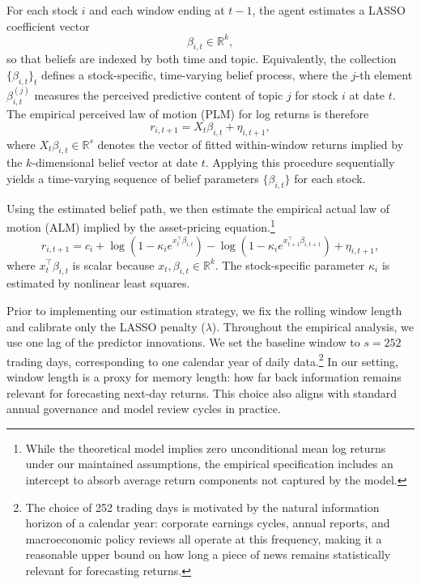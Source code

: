 For each stock \(i\) and each window ending at \(t-1\), the agent estimates a LASSO
coefficient vector
\begin{equation}
\beta_{i,t} \in \mathbb{R}^{k},
\end{equation}
so that beliefs are indexed by both time and topic. Equivalently, the collection
\(\{\beta_{i,t}\}_t\) defines a stock-specific, time-varying belief process, where the
\(j\)-th element \(\beta_{i,t}^{(j)}\) measures the perceived predictive content of topic \(j\)
for stock \(i\) at date \(t\).
The empirical perceived law of motion (PLM) for log returns is therefore
\begin{equation}\label{eq:empirical_plm}
r_{i,t+1} = X_t \beta_{i,t} + \eta_{i,t+1},
\end{equation}
where \(X_t \beta_{i,t} \in \mathbb{R}^{s}\) denotes the vector of fitted within-window returns
implied by the \(k\)-dimensional belief vector at date \(t\).
Applying this procedure sequentially yields a time-varying sequence of belief parameters
\(\{\beta_{i,t}\}\) for each stock.

Using the estimated belief path, we then estimate the empirical actual law of motion
(ALM) implied by the asset-pricing equation.\footnote{While the theoretical model implies
zero unconditional mean log returns under our maintained assumptions, the empirical
specification includes an intercept to absorb average return components not captured by
the model.}
\begin{equation}\label{eq:empirical_alm}
r_{i,t+1}
= c_i
+ \log\!\left(1 - \kappa_i e^{x_t^\top \beta_{i,t}}\right)
- \log\!\left(1 - \kappa_i e^{x_{t+1}^\top \beta_{i,t+1}}\right)
+ \eta_{i,t+1},
\end{equation}
where \(x_t^\top \beta_{i,t}\) is scalar because \(x_t, \beta_{i,t} \in \mathbb{R}^{k}\).
The stock-specific parameter \(\kappa_i\) is estimated by nonlinear least squares.


Prior to implementing our estimation strategy, we fix the rolling window length and calibrate only the LASSO penalty ($\lambda$).
Throughout the empirical analysis, we use one lag of the predictor innovations.
We set the baseline window to $s=252$ trading days, corresponding to one calendar year of daily data.\footnote{The choice of 252 trading days is motivated by the natural information horizon of a calendar year: corporate earnings cycles, annual reports, and macroeconomic policy reviews all operate at this frequency, making it a reasonable upper bound on how long a piece of news remains statistically relevant for forecasting returns.}
In our setting, window length is a proxy for memory length: how far back information remains relevant for forecasting next-day returns.
This choice also aligns with standard annual governance and model review cycles in practice.

